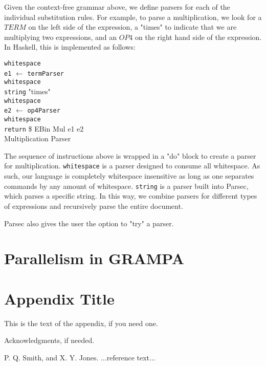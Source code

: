 \documentclass[preprint]{sigplanconf}
\begin{document}
Given the context-free grammar above, we define parsers for each of the individual substitution rules. For example, to parse a multiplication, we look for a $TERM$ on the left side of the expression, a "times" to indicate that we are multiplying two expressions, and an $OP4$ on the right hand side of the expression. In Haskell, this is implemented as follows:

\begin{algorithm}
	\texttt{whitespace} \\
	\texttt{e1} $\leftarrow$ \texttt{termParser}\\
	\texttt{whitespace} \\
	\texttt{string} "times" \\
	\texttt{whitespace} \\
	\texttt{e2} $\leftarrow$ \texttt{op4Parser} \\
	\texttt{whitespace} \\
	\texttt{return} \$ EBin Mul e1 e2  \\
	\caption{Multiplication Parser}
\end{algorithm}

The sequence of instructions above is wrapped in a "do" block to create a parser for multiplication. \texttt{whitespace} is a parser designed to consume all whitespace. As such, our language is completely whitespace insensitive as long as one separates commands by any amount of whitespace. \texttt{string} is a parser built into Parsec, which parses a specific string. In this way, we combine parsers for different types of expressions and recursively parse the entire document. 

Parsec also gives the user the option to "try" a parser. 

\section{Parallelism in GRAMPA}

\appendix
\section{Appendix Title}

This is the text of the appendix, if you need one.

\acks

Acknowledgments, if needed.





\begin{thebibliography}{}
\softraggedright

P. Q. Smith, and X. Y. Jones. ...reference text...

\end{thebibliography}
\end{document}
